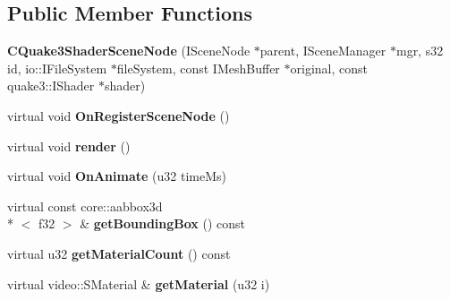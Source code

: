 \subsection*{Public Member Functions}
\begin{DoxyCompactItemize}
\item 
\hypertarget{classirr_1_1scene_1_1_c_quake3_shader_scene_node_a35c33d43469fc5ed2c96d59d4a094f04}{{\bfseries C\-Quake3\-Shader\-Scene\-Node} (I\-Scene\-Node $\ast$parent, I\-Scene\-Manager $\ast$mgr, s32 id, io\-::\-I\-File\-System $\ast$file\-System, const I\-Mesh\-Buffer $\ast$original, const quake3\-::\-I\-Shader $\ast$shader)}\label{classirr_1_1scene_1_1_c_quake3_shader_scene_node_a35c33d43469fc5ed2c96d59d4a094f04}

\item 
\hypertarget{classirr_1_1scene_1_1_c_quake3_shader_scene_node_a66169241a70ea62a750eff07e0d2c023}{virtual void {\bfseries On\-Register\-Scene\-Node} ()}\label{classirr_1_1scene_1_1_c_quake3_shader_scene_node_a66169241a70ea62a750eff07e0d2c023}

\item 
\hypertarget{classirr_1_1scene_1_1_c_quake3_shader_scene_node_ad98e893df7d7d00d3927adef1b50f48f}{virtual void {\bfseries render} ()}\label{classirr_1_1scene_1_1_c_quake3_shader_scene_node_ad98e893df7d7d00d3927adef1b50f48f}

\item 
\hypertarget{classirr_1_1scene_1_1_c_quake3_shader_scene_node_a7c3069cc60c415bfa7bac58bdb3e976f}{virtual void {\bfseries On\-Animate} (u32 time\-Ms)}\label{classirr_1_1scene_1_1_c_quake3_shader_scene_node_a7c3069cc60c415bfa7bac58bdb3e976f}

\item 
\hypertarget{classirr_1_1scene_1_1_c_quake3_shader_scene_node_afa28f470448f14a17d11f55f61c5aff5}{virtual const core\-::aabbox3d\\*
$<$ f32 $>$ \& {\bfseries get\-Bounding\-Box} () const }\label{classirr_1_1scene_1_1_c_quake3_shader_scene_node_afa28f470448f14a17d11f55f61c5aff5}

\item 
\hypertarget{classirr_1_1scene_1_1_c_quake3_shader_scene_node_afcc9731146e6d343ada2b168f9836b32}{virtual u32 {\bfseries get\-Material\-Count} () const }\label{classirr_1_1scene_1_1_c_quake3_shader_scene_node_afcc9731146e6d343ada2b168f9836b32}

\item 
\hypertarget{classirr_1_1scene_1_1_c_quake3_shader_scene_node_a130785d85842ee5d94c9f2cdca48cfee}{virtual video\-::\-S\-Material \& {\bfseries get\-Material} (u32 i)}\label{classirr_1_1scene_1_1_c_quake3_shader_scene_node_a130785d85842ee5d94c9f2cdca48cfee}


\end{DoxyCompactItemize}

